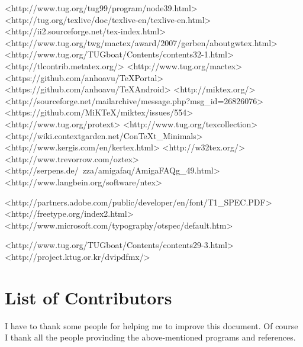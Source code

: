 	<http://www.tug.org/tug99/program/node39.html>
	<http://tug.org/texlive/doc/texlive-en/texlive-en.html>
	<http://ii2.sourceforge.net/tex-index.html>
	<http://www.tug.org/twg/mactex/award/2007/gerben/aboutgwtex.html>
	<http://www.tug.org/TUGboat/Contents/contents32-1.html>
	<http://tlcontrib.metatex.org/>
	<http://www.tug.org/mactex>
	<https://github.com/anhoavu/TeXPortal>
	<https://github.com/anhoavu/TeXAndroid>
	<http://miktex.org/>
	<http://sourceforge.net/mailarchive/message.php?msg_id=26826076>
<https://github.com/MiKTeX/miktex/issues/554>	
	<http://www.tug.org/protext>
	<http://www.tug.org/texcollection>
	<http://wiki.contextgarden.net/ConTeXt_Minimals>
	<http://www.kergis.com/en/kertex.html>
	<http://w32tex.org/>
	<http://www.trevorrow.com/oztex>
	<http://serpens.de/~zza/amigafaq/AmigaFAQg_49.html>
	<http://www.langbein.org/software/ntex>

	<http://partners.adobe.com/public/developer/en/font/T1_SPEC.PDF>
	<http://freetype.org/index2.html>
	<http://www.microsoft.com/typography/otspec/default.htm>

	<http://www.tug.org/TUGboat/Contents/contents29-3.html>
	<http://project.ktug.or.kr/dvipdfmx/>

\clearpage
\section{List of Contributors}
I have to thank some people for helping me to improve this document. Of course I thank all the people provinding the above-mentioned programs and references.

